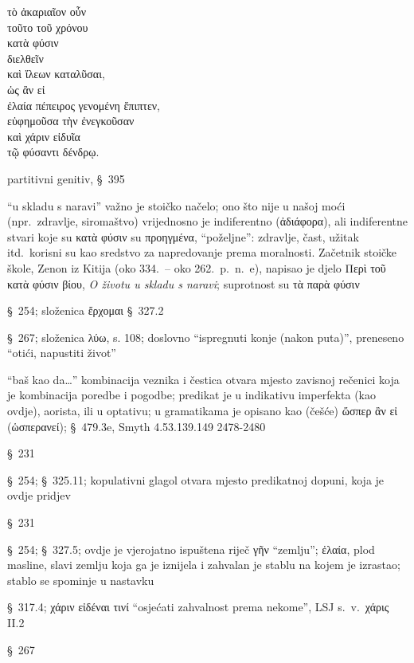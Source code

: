 {\large
\begin{greek}
\noindent τὸ ἀκαριαῖον οὖν \\
τοῦτο τοῦ χρόνου \\
\tabto{2em} κατὰ φύσιν \\
διελθεῖν \\
καὶ ἵλεων καταλῦσαι, \\
ὡς ἂν εἰ \\
\tabto{2em} ἐλαία πέπειρος γενομένη ἔπιπτεν, \\
\tabto{4em} εὐφημοῦσα τὴν ἐνεγκοῦσαν \\
\tabto{4em} καὶ χάριν εἰδυῖα \\
\tabto{6em} τῷ φύσαντι δένδρῳ.\\

\end{greek}
}

\begin{description}[noitemsep]
\item[τοῦτο τοῦ χρόνου] partitivni genitiv, §~395
\item[κατὰ φύσιν] ``u skladu s naravi'' važno je stoičko načelo; ono što nije u našoj moći (npr.\ zdravlje, siromaštvo) vrijednosno je indiferentno (ἀδιάφορα), ali indiferentne stvari koje su κατὰ φύσιν su προηγμένα, ``poželjne'': zdravlje, čast, užitak itd.\ korisni su kao sredstvo za napredovanje prema moralnosti. Začetnik stoičke škole, Zenon iz Kitija (oko 334.\ – oko 262.\ p.~n.~e), napisao je djelo Περὶ τοῦ κατὰ φύσιν βίου, \textit{O životu u skladu s naravi}; suprotnost su τὰ παρὰ φύσιν
\item[διελθεῖν] §~254; složenica ἔρχομαι §~327.2
\item[καταλῦσαι] §~267; složenica λύω, s. 108; doslovno ``ispregnuti konje (nakon puta)'', preneseno ``otići, napustiti život''
\item[ὡς ἂν εἰ] ``baš kao da\dots'' kombinacija veznika i čestica otvara mjesto zavisnoj rečenici koja je kombinacija poredbe i pogodbe; predikat je u indikativu imperfekta (kao ovdje), aorista, ili u optativu; u gramatikama je opisano kao (češće) ὥσπερ ἂν εἰ (ὡσπερανεί); §~479.3e, Smyth 4.53.139.149 2478-2480
\item[ἔπιπτεν] §~231
\item[πέπειρος γενομένη] §~254; §~325.11; kopulativni glagol otvara mjesto predikatnoj dopuni, koja je ovdje pridjev
\item[εὐφημοῦσα] §~231
\item[τὴν ἐνεγκοῦσαν] §~254; §~327.5; ovdje je vjerojatno ispuštena riječ γῆν
``zemlju''; \textgreek{ἐλαία,} plod masline, slavi zemlju koja ga je iznijela i zahvalan je stablu na kojem je izrastao; stablo se spominje u nastavku
\item[εἰδυῖα] §~317.4; χάριν εἰδέναι τινί ``osjećati zahvalnost prema nekome'', LSJ s.~v.\ χάρις II.2
\item[φύσαντι] §~267
\end{description}


